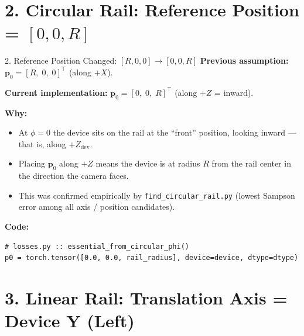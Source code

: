 \documentclass[aspectratio=169, 12pt]{beamer}
\begin{document}
\section{2. Circular Rail: Reference Position = $[0,0,R]$}

\begin{frame}{2. Reference Position Changed: $[R,0,0] \to [0,0,R]$}
\small
\textbf{Previous assumption:}
$\mathbf{p}_0 = [R,\; 0,\; 0]^\top$ (along $+X$).

\medskip
\textbf{Current implementation:}
$\mathbf{p}_0 = [0,\; 0,\; R]^\top$ (along $+Z$ = inward).

\medskip
\textbf{Why:}
\begin{itemize}\setlength{\itemsep}{2pt}
    \item At $\phi=0$ the device sits on the rail at the ``front'' position,
          looking inward --- that is, along $+Z_{\mathrm{dev}}$.
    \item Placing $\mathbf{p}_0$ along $+Z$ means the device is at radius $R$
          from the rail center in the direction the camera faces.
    \item This was confirmed empirically by \texttt{find\_circular\_rail.py}
          (lowest Sampson error among all axis / position candidates).
\end{itemize}

\medskip
\textbf{Code:}
\begin{lstlisting}
# losses.py :: essential_from_circular_phi()
p0 = torch.tensor([0.0, 0.0, rail_radius], device=device, dtype=dtype)
\end{lstlisting}
\end{frame}


\section{3. Linear Rail: Translation Axis = Device Y (Left)}
\end{document}
